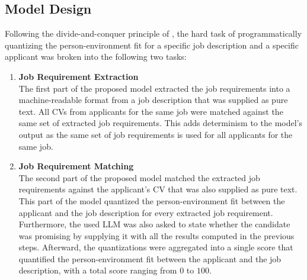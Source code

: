 \documentclass[draft,final]{thesisclass} %
\begin{document}
\subsection{Model Design}
Following the divide-and-conquer principle of \textcite{pj_fit_ml}, the hard task of programmatically quantizing the person-environment fit for a specific job description and a specific applicant was broken into the following two tasks:
\begin{enumerate}
    \item \textbf{Job Requirement Extraction}\\
    The first part of the proposed model extracted the job requirements into a machine-readable format from a job description that was supplied as pure text.
    All \acs{CV}s from applicants for the same job were matched against the same set of extracted job requirements.
    This adds determinism to the model's output as the same set of job requirements is used for all applicants for the same job.
    \item \textbf{Job Requirement Matching}\\
    The second part of the proposed model matched the extracted job requirements against the applicant's \acs{CV} that was also supplied as pure text.
    This part of the model quantized the person-environment fit between the applicant and the job description for every extracted job requirement.
    Furthermore, the used \gls{LLM} was also asked to state whether the candidate was promising by supplying it with all the results computed in the previous steps.
    Afterward, the quantizations were aggregated into a single score that quantified the person-environment fit between the applicant and the job description, with a total score ranging from $0$ to $100$.
\end{enumerate}
\end{document}
